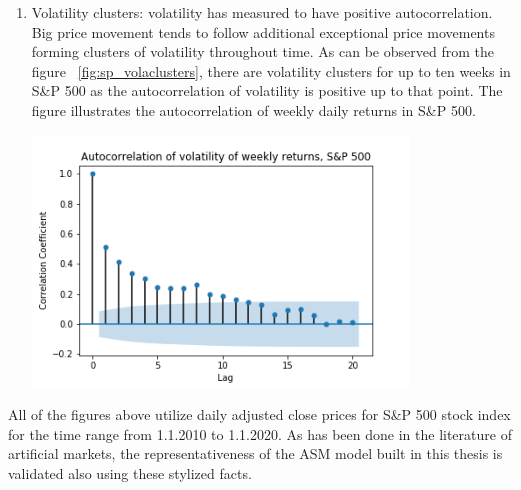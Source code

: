 \begin{enumerate}
\begin{minipage}{\linewidth}
        \label{fig:sp_autocorr}
    \end{minipage}
    \item Volatility clusters: volatility has measured to have positive autocorrelation. 
          Big price movement tends to follow additional exceptional price movements forming clusters of volatility throughout time.
          As can be observed from the figure ~\ref{fig:sp_volaclusters}, there are volatility clusters for up to ten weeks in 
          S\&P 500 as the autocorrelation of volatility is positive up to that point. 
          The figure illustrates the autocorrelation of weekly daily returns in S\&P 500.  
    \par
    \begin{minipage}{\linewidth}
        \centering
        \includegraphics[width=10cm]{plots/S&P500_vola_autocorr.png}
        \label{fig:sp_volaclusters}
    \end{minipage}
\end{enumerate} 




All of the figures above utilize daily adjusted close prices for S\&P 500 stock index 
for the time range from 1.1.2010 to 1.1.2020. 
As has been done in the literature of artificial markets, the 
representativeness of the ASM model built in this thesis is validated also 
using these stylized facts.
